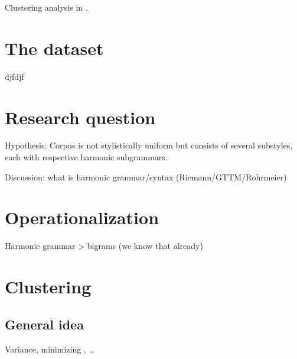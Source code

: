 \documentclass[letterpaper,10pt,english]{sphinxmanual}
\begin{document}
Clustering analysis in .

\begin{sphinxVerbatim}[commandchars=\\\{\}]
    
           
    
\end{sphinxVerbatim}


\section{The dataset}
\label{\detokenize{billboard:the-dataset}}
djfdjf


\section{Research question}
\label{\detokenize{billboard:research-question}}
Hypothesis: Corpus is not stylistically uniform but consists of several sub\sphinxhyphen{}styles,
each with respective harmonic sub\sphinxhyphen{}grammars.

Discussion: what is harmonic grammar/syntax (Riemann/GTTM/Rohrmeier)


\section{Operationalization}
\label{\detokenize{billboard:operationalization}}
Harmonic grammar \textendash{}\textgreater{} bigrams (we know that already)


\section{Clustering}
\label{\detokenize{billboard:clustering}}

\subsection{General idea}
\label{\detokenize{billboard:general-idea}}
Variance, minimizing , …
\end{document}

